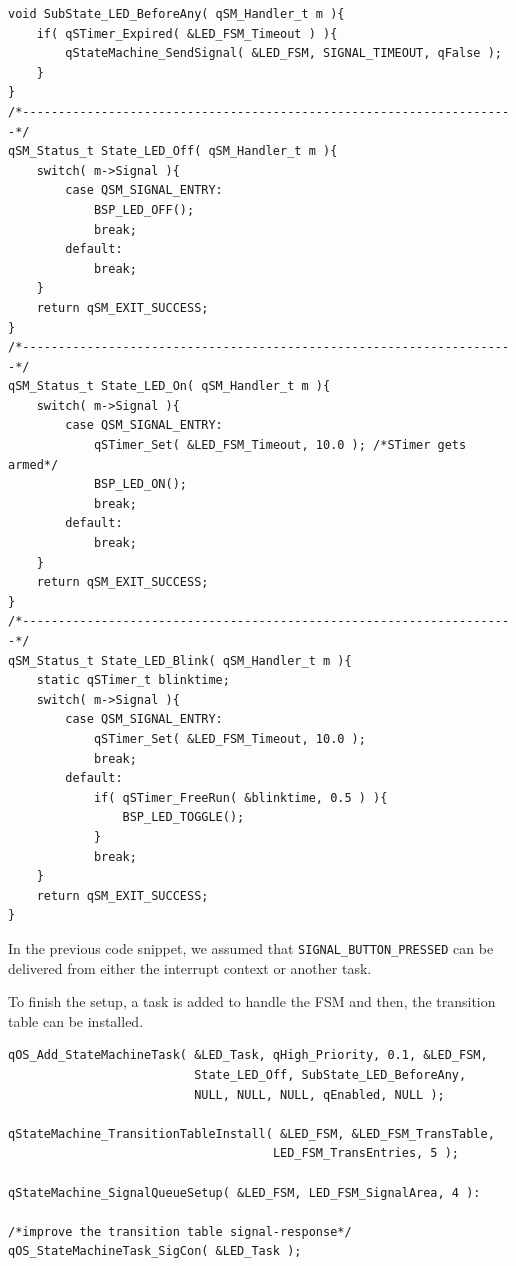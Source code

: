 \documentclass{article}
\begin{document}
\begin{lstlisting}[style=CStyle]
void SubState_LED_BeforeAny( qSM_Handler_t m ){
    if( qSTimer_Expired( &LED_FSM_Timeout ) ){
        qStateMachine_SendSignal( &LED_FSM, SIGNAL_TIMEOUT, qFalse );
    }
}
/*---------------------------------------------------------------------*/
qSM_Status_t State_LED_Off( qSM_Handler_t m ){
    switch( m->Signal ){
        case QSM_SIGNAL_ENTRY:
            BSP_LED_OFF();
            break;
        default:
            break;
    }
    return qSM_EXIT_SUCCESS;
}
/*---------------------------------------------------------------------*/
qSM_Status_t State_LED_On( qSM_Handler_t m ){
    switch( m->Signal ){
        case QSM_SIGNAL_ENTRY:
            qSTimer_Set( &LED_FSM_Timeout, 10.0 ); /*STimer gets armed*/
            BSP_LED_ON();
            break;
        default:
            break;    
    }
    return qSM_EXIT_SUCCESS;
}
/*---------------------------------------------------------------------*/
qSM_Status_t State_LED_Blink( qSM_Handler_t m ){
    static qSTimer_t blinktime;
    switch( m->Signal ){
        case QSM_SIGNAL_ENTRY:
            qSTimer_Set( &LED_FSM_Timeout, 10.0 );
            break;
        default:
            if( qSTimer_FreeRun( &blinktime, 0.5 ) ){
                BSP_LED_TOGGLE();
            }        
            break;        
    }
    return qSM_EXIT_SUCCESS;
}
\end{lstlisting}

In the previous code snippet, we assumed that \lstinline{SIGNAL_BUTTON_PRESSED} can be delivered from either the interrupt context or another task.

To finish the setup, a task is added to handle the FSM and then, the transition table can be installed. \\

\begin{lstlisting}[style=CStyle]
qOS_Add_StateMachineTask( &LED_Task, qHigh_Priority, 0.1, &LED_FSM, 
                          State_LED_Off, SubState_LED_BeforeAny, 
                          NULL, NULL, NULL, qEnabled, NULL );
                          
qStateMachine_TransitionTableInstall( &LED_FSM, &LED_FSM_TransTable,   
                                     LED_FSM_TransEntries, 5 );
                                     
qStateMachine_SignalQueueSetup( &LED_FSM, LED_FSM_SignalArea, 4 ):

/*improve the transition table signal-response*/                                    
qOS_StateMachineTask_SigCon( &LED_Task );  
\end{lstlisting}
\end{document}
